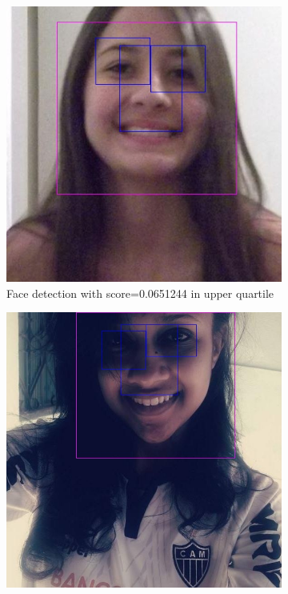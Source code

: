 \begin{figure}
    \centering
    \begin{subfigure}[t]{0.3\textwidth}
      \includegraphics[width=\textwidth]{figures/results/detected_q3_15c3f02d-31c6-4955-8d05-c05029cdb473}
      \caption{Face detection with score=0.0651244 in upper quartile}
      \label{fig:results:fd:q3_detected2}
    \end{subfigure}
    \begin{subfigure}[t]{0.3\textwidth}
      \includegraphics[width=\textwidth]{figures/results/detected_median_fcb1d3ed-7867-40ba-9691-8cd1f59dc36b}

\end{subfigure}
\end{figure}

